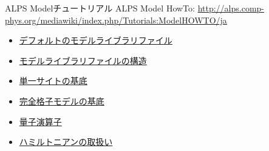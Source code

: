 \begin{frame}{ALPS Modelチュートリアル}
  ALPS Model HowTo: {\footnotesize \url{http://alps.comp-phys.org/mediawiki/index.php/Tutorials:ModelHOWTO/ja}} \\
  \begin{itemize}
  \item \href{http://alps.comp-phys.org/mediawiki/index.php/Tutorials:ModelHOWTO/ja\#.E3.83.87.E3.83.95.E3.82.A9.E3.83.AB.E3.83.88.E3.81.AE.E3.83.A2.E3.83.87.E3.83.AB.E3.83.A9.E3.82.A4.E3.83.96.E3.83.A9.E3.83.AA.E3.83.95.E3.82.A1.E3.82.A4.E3.83.AB.E3.80.80}{デフォルトのモデルライブラリファイル}
  \item \href{http://alps.comp-phys.org/mediawiki/index.php/Tutorials:ModelHOWTO/ja\#.E3.83.A2.E3.83.87.E3.83.AB.E3.83.A9.E3.82.A4.E3.83.96.E3.83.A9.E3.83.AA.E3.83.95.E3.82.A1.E3.82.A4.E3.83.AB.E3.81.AE.E6.A7.8B.E9.80.A0}{モデルライブラリファイルの構造}
  \item \href{http://alps.comp-phys.org/mediawiki/index.php/Tutorials:ModelHOWTO/ja\#.E5.8D.98.E4.B8.80.E3.82.B5.E3.82.A4.E3.83.88.E3.81.AE.E5.9F.BA.E5.BA.95}{単一サイトの基底}
  \item \href{http://alps.comp-phys.org/mediawiki/index.php/Tutorials:ModelHOWTO/ja\#.E5.AE.8C.E5.85.A8.E6.A0.BC.E5.AD.90.E3.83.A2.E3.83.87.E3.83.AB.E3.81.AE.E5.9F.BA.E5.BA.95}{完全格子モデルの基底}
  \item \href{http://alps.comp-phys.org/mediawiki/index.php/Tutorials:ModelHOWTO/ja\#.E9.87.8F.E5.AD.90.E6.BC.94.E7.AE.97.E5.AD.90}{量子演算子}
  \item \href{http://alps.comp-phys.org/mediawiki/index.php/Tutorials:ModelHOWTO/ja\#.E3.83.8F.E3.83.9F.E3.83.AB.E3.83.88.E3.83.8B.E3.82.A2.E3.83.B3.E3.81.AE.E5.8F.96.E6.89.B1.E3.81.84}{ハミルトニアンの取扱い}
  \end{itemize}
\end{frame}


